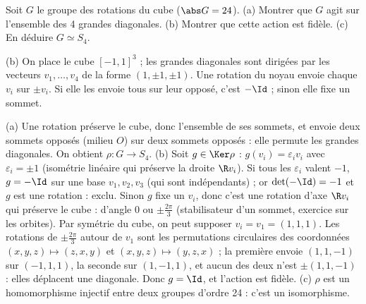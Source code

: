 \begin{exo}
Soit $G$ le groupe des rotations du cube ($\abs G=24$). (a) Montrer que $G$ agit sur l'ensemble des 4 grandes diagonales. (b) Montrer que cette action est fidèle. (c) En déduire $G\simeq S_4$.
\begin{indication}
(b) On place le cube $[-1,1]^3$ ; les grandes diagonales sont dirigées par les vecteurs $v_1,\dots,v_4$ de la forme $(1,\pm1,\pm1)$. Une rotation du noyau envoie chaque $v_i$ sur $\pm v_i$. Si elle les envoie tous sur leur opposé, c'est $-\Id$ ; sinon elle fixe un sommet.
\end{indication}
\begin{corrige}
(a) Une rotation préserve le cube, donc l'ensemble de ses sommets, et envoie deux sommets opposés (milieu $O$) sur deux sommets opposés : elle permute les grandes diagonales. On obtient $\rho:G\to S_4$.
(b) Soit $g\in\Ker\rho$ : $g(v_i)=\varepsilon_iv_i$ avec $\varepsilon_i=\pm1$ (isométrie linéaire qui préserve la droite $\R v_i$). Si tous les $\varepsilon_i$ valent $-1$, $g=-\Id$ sur une base $v_1,v_2,v_3$ (qui sont indépendants) ; or $\det(-\Id)=-1$ et $g$ est une rotation : exclu. Sinon $g$ fixe un $v_i$, donc c'est une rotation d'axe $\R v_i$ qui préserve le cube : d'angle $0$ ou $\pm\frac{2\pi}3$ (stabilisateur d'un sommet, exercice sur les orbites). Par symétrie du cube, on peut supposer $v_i=v_1=(1,1,1)$. Les rotations de $\pm\frac{2\pi}3$ autour de $v_1$ sont les permutations circulaires des coordonnées $(x,y,z)\mapsto(z,x,y)$ et $(x,y,z)\mapsto(y,z,x)$ ; la première envoie $(1,1,-1)$ sur $(-1,1,1)$, la seconde sur $(1,-1,1)$, et aucun des deux n'est $\pm(1,1,-1)$ : elles déplacent une diagonale. Donc $g=\Id$, et l'action est fidèle.
(c) $\rho$ est un homomorphisme injectif entre deux groupes d'ordre 24 : c'est un isomorphisme.
\end{corrige}
\end{exo}

